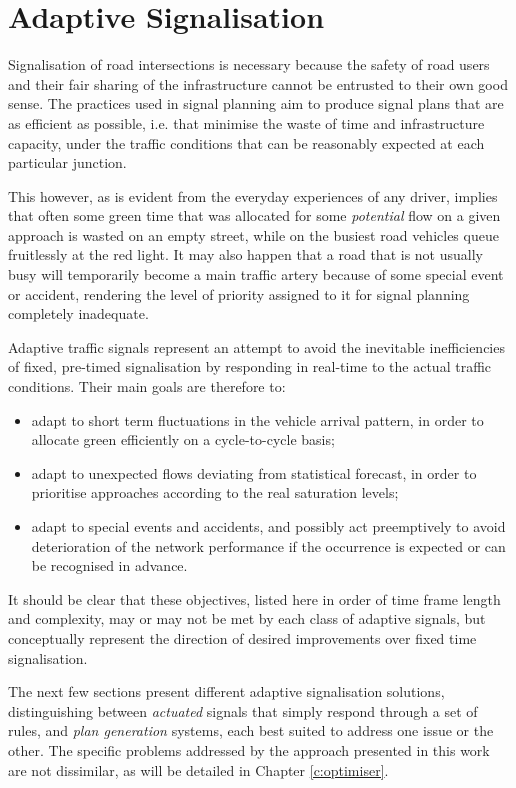 \section{Adaptive Signalisation}
Signalisation of road intersections is necessary because the safety of road users and their fair sharing of the infrastructure cannot be entrusted to their own good sense. The practices used in signal planning aim to produce signal plans that are as efficient as possible, i.e. that minimise the waste of time and infrastructure capacity, under the traffic conditions that can be reasonably expected at each particular junction.

This however, as is evident from the everyday experiences of any driver, implies that often some green time that was allocated for some \emph{potential} flow on a given approach is wasted on an empty street, while on the busiest road vehicles queue fruitlessly at the red light. It may also happen that a road that is not usually busy will temporarily become a main traffic artery because of some special event or accident, rendering the level of priority assigned to it for signal planning completely inadequate.

Adaptive traffic signals represent an attempt to avoid the inevitable inefficiencies of fixed, pre-timed signalisation by responding in real-time to the actual traffic conditions. Their main goals are therefore to:
\begin{itemize}
\item adapt to short term fluctuations in the vehicle arrival pattern, in order to allocate green efficiently on a cycle-to-cycle basis;
\item adapt to unexpected flows deviating from statistical forecast, in order to prioritise approaches according to the real saturation levels;
\item adapt to special events and accidents, and possibly act preemptively to avoid deterioration of the network performance if the occurrence is expected or can be recognised in advance.
\end{itemize}
It should be clear that these objectives, listed here in order of time frame length and complexity, may or may not be met by each class of adaptive signals, but conceptually represent the direction of desired improvements over fixed time signalisation. 

The next few sections present different adaptive signalisation solutions, distinguishing between \emph{actuated} signals that simply respond through a set of rules, and \emph{plan generation} systems, each best suited to address one issue or the other. The specific problems addressed by the approach presented in this work are not dissimilar, as will be detailed in Chapter \ref{c:optimiser}.

